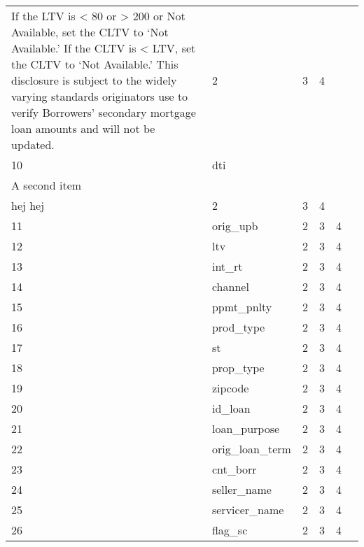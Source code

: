 \begin{center}
\begin{longtable}{@{}
>{\raggedright}p{.3cm}
p{6.5cm}
>{\raggedright}p{3cm}
>{\raggedright}p{1.5cm}p{1.5cm}@{}
p{1cm}
@{}}
If the LTV is < 80 or > 200 or Not Available, set the CLTV to ‘Not Available.’ If the CLTV is < LTV, set the CLTV to ‘Not Available.’
This disclosure is subject to the widely varying standards originators use to verify Borrowers’ secondary mortgage loan amounts and will not be updated. & \tiny 2 & \tiny  3  &\tiny  4\\ 
\tiny 10 &\tiny  dti \multirow{2}{*}{\begin{tabular}{@{}>{\textbullet\hspace{\labelsep}}l}
   An itemized list begins here\\ A second item \\ hej hej \end{tabular}} & \tiny 2 & \tiny  3 & \tiny 4\\ 
\tiny 11 &\tiny  orig\_upb & \tiny 2 & \tiny  3  &\tiny  4\\
\tiny 12 &\tiny  ltv & \tiny 2 & \tiny  3 & \tiny 4 \\ 
\tiny 13 &\tiny  int\_rt & \tiny 2 & \tiny  3 & \tiny 4\\ 
\tiny 14 &\tiny  channel & \tiny 2 & \tiny  3 & \tiny 4 \\
\tiny 15 &\tiny  ppmt\_pnlty & \tiny 2 & \tiny  3  &\tiny  4\\ 
\tiny 16 &\tiny  prod\_type & \tiny 2 & \tiny  3 & \tiny 4\\ 
\tiny 17 &\tiny  st & \tiny 2 & \tiny  3  &\tiny  4\\
\tiny 18 &\tiny  prop\_type & \tiny 2 & \tiny  3 & \tiny 4 \\ 
\tiny 19 &\tiny  zipcode & \tiny 2 & \tiny  3 & \tiny 4\\ 
\tiny 20 &\tiny  id\_loan & \tiny 2 & \tiny  3 & \tiny 4 \\
\tiny 21 &\tiny  loan\_purpose & \tiny 2 & \tiny  3  &\tiny  4\\ 
\tiny 22 &\tiny  orig\_loan\_term & \tiny 2 & \tiny  3 & \tiny 4\\ 
\tiny 23 &\tiny  cnt\_borr & \tiny 2 & \tiny  3  &\tiny  4\\
\tiny 24 &\tiny  seller\_name & \tiny 2 & \tiny  3  &\tiny  4\\ 
\tiny 25 &\tiny  servicer\_name & \tiny 2 & \tiny  3 & \tiny 4\\ 
\tiny 26 &\tiny  flag\_sc & \tiny 2 & \tiny  3  &\tiny  4\\
\end{longtable}
\end{center}


